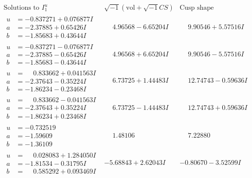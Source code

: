 \documentclass[1p]{elsarticle_modified}
\theoremstyle{definition}
\newcommand{\I}{\sqrt{-1}}
\begin{document}
$$\begin{array}{c|c|c}  
\text{Solutions to }I^u_{1}& \I (\text{vol} + \sqrt{-1}CS) & \text{Cusp shape}\\
 \hline 
\begin{aligned}
u &= -0.837271 + 0.076877 I \\
a &= -2.37885 + 0.65426 I \\
b &= -1.85683 + 0.43644 I\end{aligned}
 & \phantom{-}4.96568 - 6.65204 I & \phantom{-}9.90546 + 5.57516 I \\ \hline\begin{aligned}
u &= -0.837271 - 0.076877 I \\
a &= -2.37885 - 0.65426 I \\
b &= -1.85683 - 0.43644 I\end{aligned}
 & \phantom{-}4.96568 + 6.65204 I & \phantom{-}9.90546 - 5.57516 I \\ \hline\begin{aligned}
u &= \phantom{-}0.833662 + 0.041563 I \\
a &= -2.37643 - 0.35224 I \\
b &= -1.86234 - 0.23468 I\end{aligned}
 & \phantom{-}6.73725 + 1.44483 I & \phantom{-}12.74743 - 0.59636 I \\ \hline\begin{aligned}
u &= \phantom{-}0.833662 - 0.041563 I \\
a &= -2.37643 + 0.35224 I \\
b &= -1.86234 + 0.23468 I\end{aligned}
 & \phantom{-}6.73725 - 1.44483 I & \phantom{-}12.74743 + 0.59636 I \\ \hline\begin{aligned}
u &= -0.732519\phantom{ +0.000000I} \\
a &= -1.59609\phantom{ +0.000000I} \\
b &= -1.36109\phantom{ +0.000000I}\end{aligned}
 & \phantom{-}1.48106\phantom{ +0.000000I} & \phantom{-}7.22880\phantom{ +0.000000I} \\ \hline\begin{aligned}
u &= \phantom{-}0.028083 + 1.284050 I \\
a &= -1.81534 - 0.31795 I \\
b &= \phantom{-}0.585292 + 0.093469 I\end{aligned}
 & -5.68843 + 2.62043 I & -0.80670 - 3.52599 I \\ \hline\begin{aligned}

\end{aligned}
\end{array}$$
\end{document}
